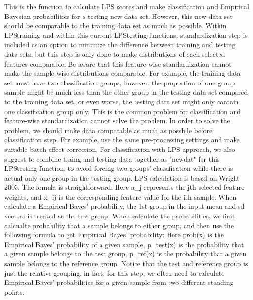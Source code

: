 \documentclass[letterpaper]{book}
\begin{document}
%
\begin{Details}\relax
This is the function to calculate LPS scores and make classification and 
Empirical Bayesian probabilities for a testing new data set. However, this new data set should be 
comparable to the training data set as much as possible. Within LPStraining and within this current 
LPStesting functions, standardization step is included as an option to minimize the difference 
between training and testing data sets, but this step is only done to make distributions of each selected
features comparable. Be aware that this feature-wise standardization cannot make the sample-wise distributions
comparable. For example, the training data set must have two classification groups, however, 
the proportion of one group sample might be much less than the other group in the testing data set 
compared to the training data set, or even worse, the testing data set might only contain one classification 
group only. This is the common problem for classification and feature-wise standardization cannot solve the problem. 
In order to solve the problem, we should make data comparable as much as possbile before classification step. 
For example, use the same pre-processing settings and make suitable batch effect correction. 
For classification with LPS approach, we also suggest to combine traing and testing data together as "newdat" 
for this LPStesting function, to avoid forcing two groups' classification while there is actual only one group
in the testing group.
LPS calculation is based on Wright 2003. The fomula is straightforward:
Here a\_j represents the jth selected feature weights, and x\_ij is the corresponding feature value for the ith sample.
When calculate a Empirical Bayes' probability, the 1st group in the input mean and sd vectors is treated as the 
test group. When calculate the probabilities, we first calcualte probability that a sample belongs to either group,
and then use the following formula to get Empirical Bayes' probability:
Here prob(x) is the Empirical Bayes' probability of a given sample, p\_test(x) is the probability that a given sample
belongs to the test group, p\_ref(x) is the probability that a given sample belongs to the reference group.
Notice that the test and reference group is just the relative grouping, in fact, for this step, we often need
to calculate Empirical Bayes' probabilities for a given sample from two different standing points.
\end{Details}
\end{document}
